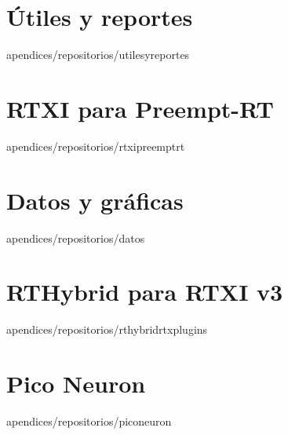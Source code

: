 \documentclass[epsbased,copyright,final,printable,covers,extendedindex,firstnumbered,tfg,gnuplot]{tfgtfmthesisuam}
\begin{document}
  \section{Útiles y reportes\label{SEC:UTILESYREPORTSREPO}}{apendices/repositorios/utilesyreportes}
  \section{RTXI para Preempt-RT\label{SEC:RTXIPREEMPTREPO}}{apendices/repositorios/rtxipreemptrt}
  \section{Datos y gráficas\label{SEC:DATOSREPO}}{apendices/repositorios/datos}
  \section{RTHybrid para RTXI v3\label{SEC:RTHPRTXI3REPO}}{apendices/repositorios/rthybridrtxplugins}
  \section{Pico Neuron\label{SEC:PICONEURONREPO}}{apendices/repositorios/piconeuron}
  
\end{document}

